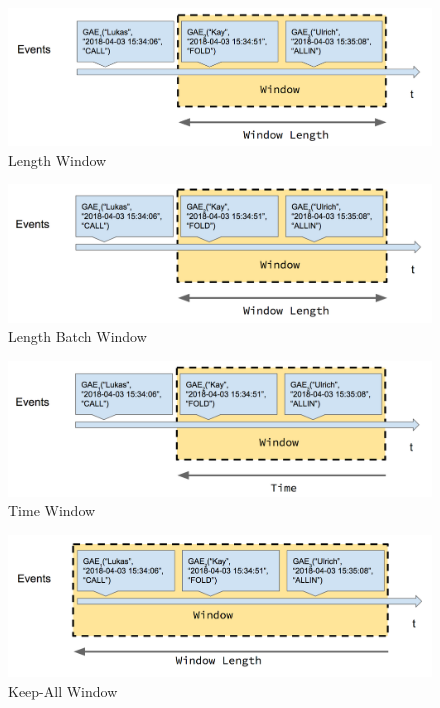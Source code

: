 \begin{figure}[ht]
	\centering
	\includegraphics[width=\textwidth,height=\textheight,keepaspectratio]{images/data_window_length.png}
	\caption{Length Window}
	\label{LengthWindow}
\end{figure}

\begin{figure}[ht]
	\centering
	\includegraphics[width=\textwidth,height=\textheight,keepaspectratio]{images/data_window_length_batch.png}
	\caption{Length Batch Window}
	\label{LengthBatchWindow}
\end{figure}

\begin{figure}[ht]
	\centering
	\includegraphics[width=\textwidth,height=\textheight,keepaspectratio]{images/data_window_time.png}
	\caption{Time Window}
	\label{TimeWindow}
\end{figure}

\begin{figure}[ht]
	\centering
	\includegraphics[width=\textwidth,height=\textheight,keepaspectratio]{images/data_window_keep_all.png}
	\caption{Keep-All Window}
	\label{KeepAllWindow}
\end{figure}

